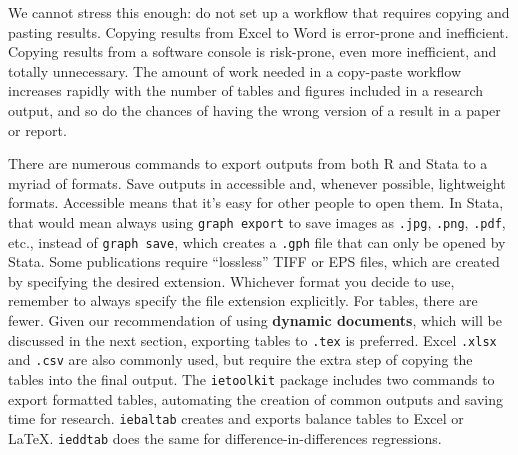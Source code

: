 We cannot stress this enough:
do not set up a workflow that requires copying and pasting results.
Copying results from Excel to Word is error-prone and inefficient.
Copying results from a software console is risk-prone,
even more inefficient, and totally unnecessary.
The amount of work needed in a copy-paste workflow increases
rapidly with the number of tables and figures included in a research output,
and so do the chances of having the wrong version of a result in a paper or report.

There are numerous commands to export outputs from both R and Stata to a myriad of formats.
Save outputs in accessible and, whenever possible, lightweight formats.
Accessible means that it's easy for other people to open them.
In Stata, that would mean always using \texttt{graph export} to save images as
\texttt{.jpg}, \texttt{.png}, \texttt{.pdf}, etc.,
instead of \texttt{graph save},
which creates a \texttt{.gph} file that can only be opened by Stata.
Some publications require ``lossless'' TIFF or EPS files, 
which are created by specifying the desired extension.
Whichever format you decide to use, 
remember to always specify the file extension explicitly.
For tables, there are fewer.
Given our recommendation of using \textbf{dynamic documents},
which will be discussed in the next section,
exporting tables to \texttt{.tex} is preferred.
Excel \texttt{.xlsx} and \texttt{.csv} are also commonly used,
but require the extra step of copying the tables into the final output.
The \texttt{ietoolkit} package includes two commands to export formatted tables,
automating the creation of common outputs and saving time for research.
\texttt{iebaltab}
creates and exports balance tables to Excel or {\LaTeX}.
\texttt{ieddtab}
does the same for difference-in-differences regressions.

